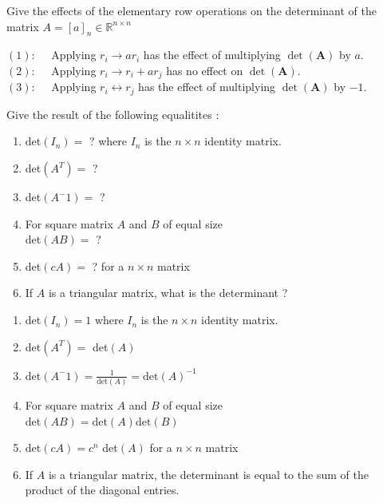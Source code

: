 \documentclass[12pt]{article}
\newcommand*{\xfield}[1]{\begin{mdframed}\centering #1\end{mdframed}\bigskip}
\newenvironment{note}{}{}
\begin{document}
\begin{note}
	\xfield{Give the effects of the elementary row operations on the determinant of the matrix $A = [a]_n \in \mathbb{R}^{n\times n}$}
	\xfield{$(1): \quad$ Applying $r_i \to ar_i$ has the effect of multiplying $\det \left({\mathbf A}\right)$ by $a$.\\
$(2): \quad$ Applying $r_i \to r_i + ar_j$ has no effect on $\det \left({\mathbf A}\right)$.\\
$(3): \quad$ Applying $r_i \leftrightarrow r_j$ has the effect of multiplying $\det \left({\mathbf A}\right)$ by $-1$.}
\end{note}

\begin{note}
	\xfield{Give the result of the following equalitites :\\
	\begin{enumerate}
	\item det$(I_n) =$ ? where $I_n$ is the $n \times n$ identity matrix.
	\item det$(A^T) =$ ?
	\item det$(A^-1) =$ ?
	\item For square matrix $A$ and $B$ of equal size\\
	det$(AB) =$ ?
	\item det$(cA) =$ ? for a $n \times n$ matrix
	\item If $A$ is a triangular matrix, what is the determinant ?
	\end{enumerate} }
	\xfield{\begin{enumerate}
	\item det$(I_n) = 1$ where $I_n$ is the $n \times n$ identity matrix.
	\item det$(A^T) =$ det$(A)$
	\item det$(A^-1) = \frac{1}{\text{det}(A)} = \text{det}(A)^{-1}$
	\item For square matrix $A$ and $B$ of equal size\\
	det$(AB) = \text{det}(A)\text{det}(B)$
	\item det$(cA) = c^n$ det$(A)$ for a $n \times n$ matrix
	\item If $A$ is a triangular matrix, the determinant is equal to the sum of the product of the diagonal entries.
	\end{enumerate} }
\end{note}
\end{document}
